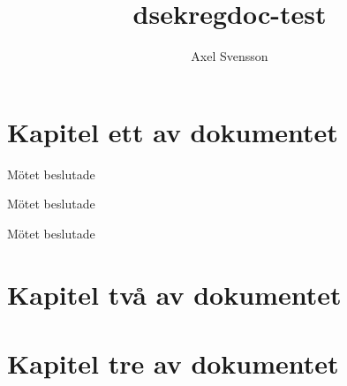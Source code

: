 \documentclass{dsekregdoc}
\title{\textsf{dsekregdoc}-test}
\author{Axel Svensson}
\begin{document}
\section{Kapitel ett av dokumentet}
\begin{regsection}
  \lipsum[1]

  Mötet beslutade
  \begin{attlist}
  \item \lipsum[4][1]
  \item \lipsum[4][2]
  \end{attlist}

  \lipsum[2]

  Mötet beslutade
  \begin{attlist}
  \item \lipsum[4][3]
  \item \lipsum[4][4]

  \end{attlist}

  \lipsum[3]

  \begin{samepage}
    Mötet beslutade
    \begin{attlist}
    \item \lipsum[4][5]
    \item \lipsum[4][6]
    \end{attlist}
  \end{samepage}

\end{regsection}
\section{Kapitel två av dokumentet}
\begin{regsection}
  \lipsum[5-6]
\end{regsection}

\section{Kapitel tre av dokumentet}
\lipsum[7-8]
\end{document}
